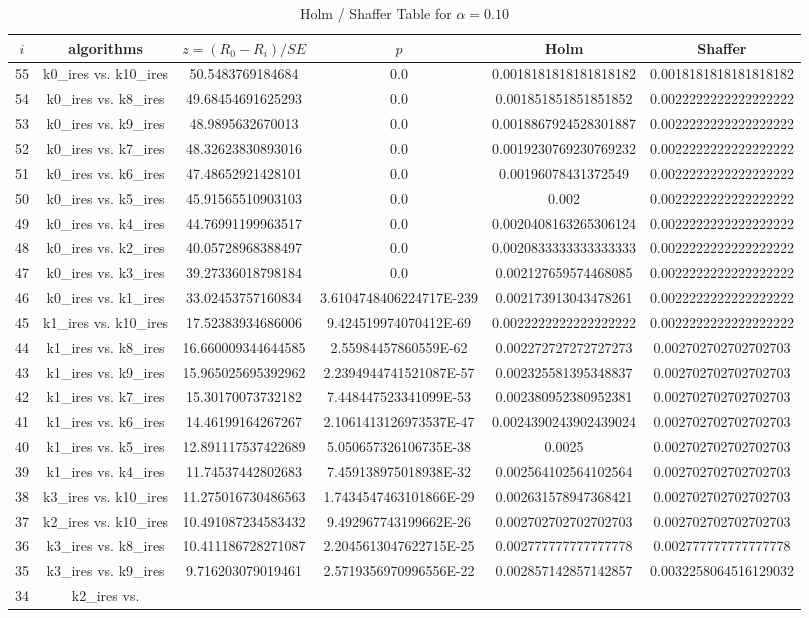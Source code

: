 \documentclass[a4paper,10pt]{article}
\begin{document}
\begin{landscape}
\begin{table}[!htp]
\centering\tiny
\caption{Holm / Shaffer Table for $\alpha=0.10$}
\begin{tabular}{cccccc}
$i$&algorithms&$z=(R_0 - R_i)/SE$&$p$&Holm&Shaffer\\
\hline
55&k0_ires vs. k10_ires&50.5483769184684&0.0&0.0018181818181818182&0.0018181818181818182\\54&k0_ires vs. k8_ires&49.68454691625293&0.0&0.001851851851851852&0.0022222222222222222\\53&k0_ires vs. k9_ires&48.9895632670013&0.0&0.0018867924528301887&0.0022222222222222222\\52&k0_ires vs. k7_ires&48.32623830893016&0.0&0.0019230769230769232&0.0022222222222222222\\51&k0_ires vs. k6_ires&47.48652921428101&0.0&0.00196078431372549&0.0022222222222222222\\50&k0_ires vs. k5_ires&45.91565510903103&0.0&0.002&0.0022222222222222222\\49&k0_ires vs. k4_ires&44.76991199963517&0.0&0.0020408163265306124&0.0022222222222222222\\48&k0_ires vs. k2_ires&40.05728968388497&0.0&0.0020833333333333333&0.0022222222222222222\\47&k0_ires vs. k3_ires&39.27336018798184&0.0&0.002127659574468085&0.0022222222222222222\\46&k0_ires vs. k1_ires&33.02453757160834&3.6104748406224717E-239&0.002173913043478261&0.0022222222222222222\\45&k1_ires vs. k10_ires&17.52383934686006&9.424519974070412E-69&0.0022222222222222222&0.0022222222222222222\\44&k1_ires vs. k8_ires&16.660009344644585&2.55984457860559E-62&0.002272727272727273&0.002702702702702703\\43&k1_ires vs. k9_ires&15.965025695392962&2.2394944741521087E-57&0.002325581395348837&0.002702702702702703\\42&k1_ires vs. k7_ires&15.30170073732182&7.448447523341099E-53&0.002380952380952381&0.002702702702702703\\41&k1_ires vs. k6_ires&14.46199164267267&2.1061413126973537E-47&0.0024390243902439024&0.002702702702702703\\40&k1_ires vs. k5_ires&12.891117537422689&5.050657326106735E-38&0.0025&0.002702702702702703\\39&k1_ires vs. k4_ires&11.74537442802683&7.459138975018938E-32&0.002564102564102564&0.002702702702702703\\38&k3_ires vs. k10_ires&11.275016730486563&1.7434547463101866E-29&0.002631578947368421&0.002702702702702703\\37&k2_ires vs. k10_ires&10.491087234583432&9.492967743199662E-26&0.002702702702702703&0.002702702702702703\\36&k3_ires vs. k8_ires&10.411186728271087&2.2045613047622715E-25&0.002777777777777778&0.002777777777777778\\35&k3_ires vs. k9_ires&9.716203079019461&2.5719356970996556E-22&0.002857142857142857&0.0032258064516129032\\34&k2_ires vs. 
\end{tabular}
\end{table}
\end{landscape}
\end{document}
